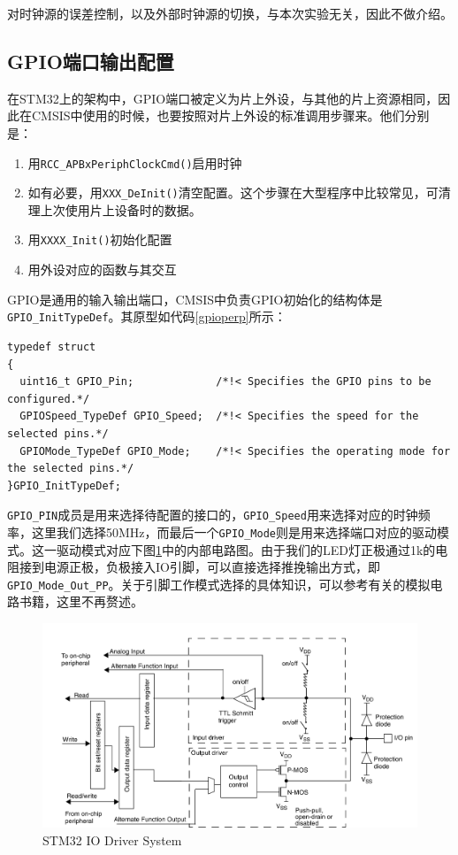 \documentclass{ctexart}
\begin{document}
对时钟源的误差控制，以及外部时钟源的切换，与本次实验无关，因此不做介绍。

\subsection{GPIO端口输出配置}

在STM32上的架构中，GPIO端口被定义为片上外设，与其他的片上资源相同，因此在CMSIS中使用的时候，也要按照对片上外设的标准调用步骤来。他们分别是：
\begin{enumerate}
\item 用\lstinline{RCC_APBxPeriphClockCmd()}启用时钟
\item 如有必要，用\lstinline{XXX_DeInit()}清空配置。这个步骤在大型程序中比较常见，可清理上次使用片上设备时的数据。
\item 用\lstinline{XXXX_Init()}初始化配置
\item 用外设对应的函数与其交互
\end{enumerate}
GPIO是通用的输入输出端口，CMSIS中负责GPIO初始化的结构体是\lstinline{GPIO_InitTypeDef}。其原型如代码\ref{gpioperp}所示：
\begin{lstlisting}[caption={GPIOInitTypeDef},label={gpioperp}]
typedef struct
{
  uint16_t GPIO_Pin;             /*!< Specifies the GPIO pins to be configured.*/
  GPIOSpeed_TypeDef GPIO_Speed;  /*!< Specifies the speed for the selected pins.*/
  GPIOMode_TypeDef GPIO_Mode;    /*!< Specifies the operating mode for the selected pins.*/
}GPIO_InitTypeDef;
\end{lstlisting}
\lstinline{GPIO_PIN}成员是用来选择待配置的接口的，\lstinline{GPIO_Speed}用来选择对应的时钟频率，这里我们选择50MHz，而最后一个\lstinline{GPIO_Mode}则是用来选择端口对应的驱动模式。这一驱动模式对应下图\ref{stm32iodriver}中的内部电路图。由于我们的LED灯正极通过1k的电阻接到电源正极，负极接入IO引脚，可以直接选择推挽输出方式，即\lstinline{GPIO_Mode_Out_PP}。关于引脚工作模式选择的具体知识，可以参考有关的模拟电路书籍，这里不再赘述。
\begin{figure}[h]\centering\includegraphics[width=\textwidth]{./img/ioport.png}\caption{STM32 IO Driver System}\label{stm32iodriver}\end{figure}
\end{document}
